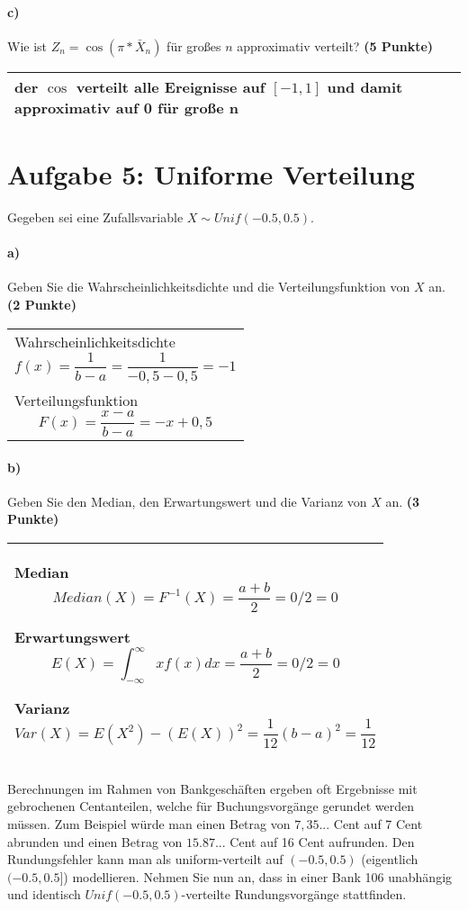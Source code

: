 \documentclass[10pt, a4paper]{article}
\begin{document}
\paragraph{c)} Wie ist $Z_n= \cos(\pi*\bar{X}_n)$ für großes $n$ approximativ verteilt? \textbf{(5 Punkte)}\\
\begin{tabular}{| p{17cm} |}
    \hline
    der $\cos$ verteilt alle Ereignisse auf $[-1,1]$ und damit approximativ auf 0 für große n
    \\\hline
\end{tabular}

\section{Aufgabe 5: Uniforme Verteilung}
Gegeben sei eine Zufallsvariable $X\sim Unif(-0.5,0.5)$.
\paragraph{a)} Geben Sie die Wahrscheinlichkeitsdichte und die Verteilungsfunktion von $X$ an. \textbf{(2 Punkte)}\\
\begin{tabular}{| p{17cm} |}
    \hline
    Wahrscheinlichkeitsdichte $$f(x)=\frac{1}{b-a} = \frac{1}{-0,5 - 0,5} = -1$$\\
    Verteilungsfunktion $$F(x)=\frac{x-a}{b-a} = -x+0,5$$
    \\\hline
\end{tabular}

\paragraph{b)} Geben Sie den Median, den Erwartungswert und die Varianz von $X$ an. \textbf{(3 Punkte)}\\
\begin{tabular}{| p{17cm} |}
    \hline
    Median $$Median(X)=F^{-1}(X)=\frac{a+b}{2}= 0/2 = 0$$

    Erwartungswert $$E(X)=\int_{-\infty}^{\infty} xf(x) dx = \frac{a+b}{2} = 0/2 = 0$$

    Varianz $$Var(X)=E(X^2)-(E(X))^2 = \frac{1}{12}(b-a)^2 = \frac{1}{12}$$
    \\\hline
\end{tabular}
\newline
Berechnungen im Rahmen von Bankgeschäften ergeben oft Ergebnisse mit gebrochenen Centanteilen, welche für Buchungsvorgänge gerundet werden müssen. Zum Beispiel würde man einen Betrag von $7,35...$ Cent auf 7 Cent abrunden und einen Betrag von $15.87...$ Cent auf 16 Cent aufrunden. Den Rundungsfehler kann man als uniform-verteilt auf $(-0.5,0.5)$ (eigentlich $(-0.5,0.5]$) modellieren. Nehmen Sie nun an, dass in einer Bank 106 unabhängig und identisch $Unif(-0.5,0.5)$-verteilte Rundungsvorgänge stattfinden.
\end{document}
